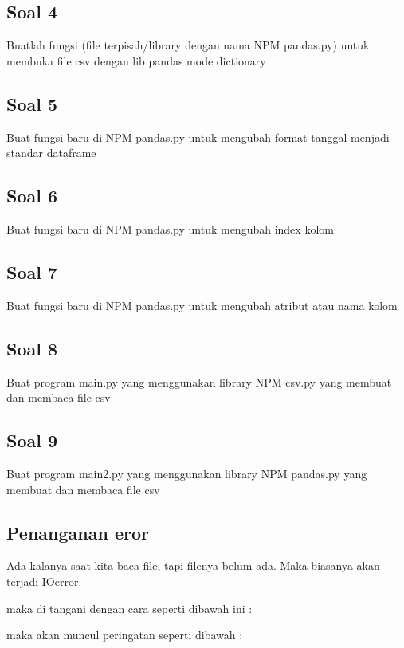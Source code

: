 \subsection{Soal 4}
Buatlah fungsi (file terpisah/library dengan nama NPM pandas.py) untuk membuka file csv dengan lib pandas mode dictionary


\subsection{Soal 5}
Buat fungsi baru di NPM pandas.py untuk mengubah format tanggal menjadi standar dataframe


\subsection{Soal 6}
Buat fungsi baru di NPM pandas.py untuk mengubah index kolom


\subsection{Soal 7}
Buat fungsi baru di NPM pandas.py untuk mengubah atribut atau nama kolom


\subsection{Soal 8}
Buat program main.py yang menggunakan library NPM csv.py yang membuat dan membaca file csv


\subsection{Soal 9}
Buat program main2.py yang menggunakan library NPM pandas.py yang membuat dan membaca file csv


\subsection{Penanganan eror}
Ada kalanya saat kita baca file, tapi filenya belum ada. Maka biasanya akan terjadi IOerror.

maka di tangani dengan cara seperti dibawah ini :

maka akan muncul peringatan seperti dibawah :




